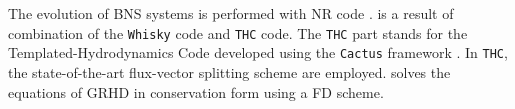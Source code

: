 
The evolution of \ac{BNS} systems is performed with \wisky{} \ac{NR} code
 \citep{Radice:2013apa,Radice:2012cu,Radice:2013xpa,Radice:2013hxh,
    Radice:2015nva,Radice:2016dwd,Radice:2018pdn,Radice:2020ids}.
\wisky{} is a result of combination of the \texttt{Whisky} code \citep{Baiotti:2004wn} and \texttt{THC} code.
The \texttt{THC} part stands for the Templated-Hydrodynamics Code developed using the \texttt{Cactus} framework 
\citep{Goodale:2003}. 
In \texttt{THC}, the state-of-the-art flux-vector splitting scheme are employed. 
%
%
%
\wisky{} solves the equations of \ac{GRHD} in conservation form using a \ac{FD} scheme. 

